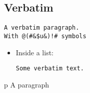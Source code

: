 \documentclass[
  text,
  markdown={section level=3},
]{internet}
\begin{document}
\subsection{Verbatim}

\begin{verbatim}
A verbatim paragraph.
With @(#&$u&)!# symbols
\end{verbatim}

\begin{itemize}
\item Inside a list:

\begin{verbatim}
Some verbatim text.
\end{verbatim}

\end{itemize}


\begin{html}{p}
A paragraph
\end{html}
\end{document}

